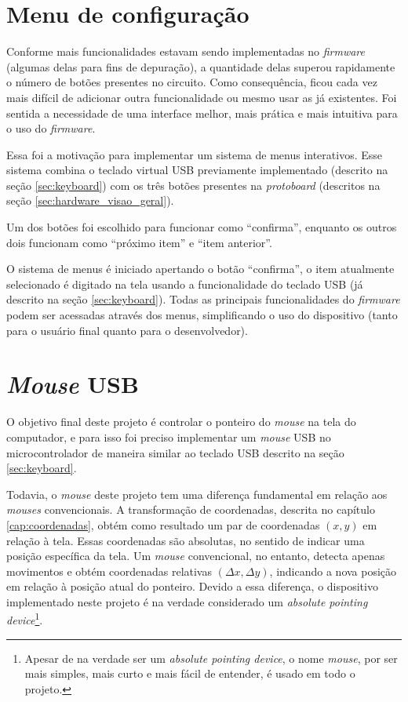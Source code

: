 \documentclass[brazil,pagestart=firstchapter]{abnt}
\begin{document}
\section{Menu de configuração}
\label{sec:menu}

Conforme mais funcionalidades estavam sendo implementadas no
\textit{firmware} (algumas delas para fins de depuração), a quantidade delas
superou rapidamente o número de botões presentes no circuito. Como
consequência, ficou cada vez mais difícil de adicionar outra funcionalidade
ou mesmo usar as já existentes. Foi sentida a necessidade de uma interface
melhor, mais prática e mais intuitiva para o uso do \textit{firmware}.

Essa foi a motivação para implementar um sistema de menus interativos. Esse
sistema combina o teclado virtual \ac{USB} previamente implementado
(descrito na seção \ref{sec:keyboard}) com os três botões presentes na
\textit{protoboard} (descritos na seção \ref{sec:hardware_visao_geral}).

Um dos botões foi escolhido para funcionar como ``confirma'', enquanto os
outros dois funcionam como ``próximo item'' e ``item anterior''.

O sistema de menus é iniciado apertando o botão ``confirma'', o
item atualmente selecionado é digitado na tela usando a funcionalidade do
teclado \ac{USB} (já descrito na seção \ref{sec:keyboard}). Todas as
principais funcionalidades do \textit{firmware} podem ser acessadas através
dos menus, simplificando o uso do dispositivo (tanto para o usuário final
quanto para o desenvolvedor).


\section{\textit{Mouse} USB}
\label{sec:mouse}

O objetivo final deste projeto é controlar o ponteiro do \textit{mouse} na
tela do computador, e para isso foi preciso implementar um \textit{mouse}
USB no microcontrolador de maneira similar ao teclado USB descrito na seção
\ref{sec:keyboard}.

Todavia, o \textit{mouse} deste projeto tem uma diferença fundamental em
relação aos \textit{mouses} convencionais. A transformação de coordenadas,
descrita no capítulo \ref{cap:coordenadas}, obtém como resultado um par de
coordenadas $(x, y)$ em relação à tela. Essas coordenadas são absolutas, no
sentido de indicar uma posição específica da tela. Um \textit{mouse}
convencional, no entanto, detecta apenas movimentos e obtém coordenadas
relativas $(\Delta x, \Delta y)$, indicando a nova posição em relação à
posição atual do ponteiro. Devido a essa diferença, o dispositivo
implementado neste projeto é na verdade considerado um \textit{absolute
pointing device}\footnote{
	Apesar de na verdade ser um \textit{absolute pointing device}, o nome
	\textit{mouse}, por ser mais simples, mais curto e mais fácil de
	entender, é usado em todo o projeto.
}.
\end{document}
